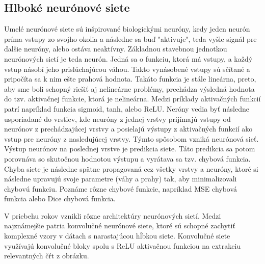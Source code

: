 \subsection{Hlboké neurónové siete}
Umelé neurónové siete sú inšpirované biologickými neuróny, kedy jeden neurón príma vstupy zo svojho okolia a následne sa buď "aktivuje", teda vyšle signál pre ďalšie neuróny, alebo ostáva neaktívny. Základnou stavebnou jednotkou neurónových sietí je teda neurón. Jedná sa o funkciu, ktorá má vstupy, a každý vstup násobí jeho prislúchajúcou váhou. Takto vynásobené vstupy sú sčítané a pripočíta sa k nim ešte prahová hodnota. Takáto funkcia je stále lineárna, preto, aby sme boli schopný riešiť aj nelineárne problémy, prechádza výsledná hodnota do tzv. aktivačnej funkcie, ktorá je nelineárna. Medzi príklady aktivačných funkcií patrí napríklad funkcia sigmoid, tanh, alebo ReLU. Neróny vedia byť následne usporiadané do vrstiev, kde neuróny z jednej vrstvy prijímajú vstupy od neurónov z prechádzajúcej vrstvy a posielajú výstupy z aktivačných funkcií ako vstup pre neuróny z nasledujúcej vrstvy. Týmto spôsobom vzniká neurónová sieť. Výstup neurónov na poslednej vrstve je predikcia siete. Táto predikcia sa potom porovnáva so skutočnou hodnotou výstupu a vyrátava sa tzv. chybová funkcia. Chyba siete je následne spätne propagovaná cez všetky vrstvy a neuróny, ktoré si následne upravujú svoje parametre (váhy a prahy) tak, aby minimalizovali chybovú funkciu. Poznáme rôzne chybové funkcie, napríklad MSE chybová funkcia alebo Dice chybová funkcia.

V priebehu rokov vznikli rôzne architektúry neurónových sietí. Medzi najznámejšie patria konvolučné neurónové siete, ktoré sú schopné zachytiť komplexné vzory v dátach s narastajúcou hĺbkou siete. Konvolučné siete využívajú konvolučné bloky spolu s ReLU aktivačnou funkciou na extrakciu relevantných čŕt z obrázku.

